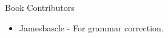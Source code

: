 \large Book Contributors \newline
\begin{itemize}
	\item Jamesbascle - For grammar correction.
\end{itemize}

\newpage